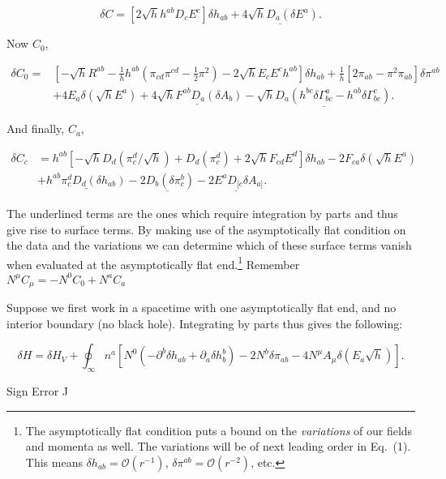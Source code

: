 \documentclass[titlepage]{article}
\def\beq{\begin{equation}}
\def\eeq{\end{equation}}
\begin{document}
\beq
\delta C = \left[2 \sqrt{h} h^{ab}D_cE^c \right] \delta h_{ab} + \underline{4\sqrt{h} D_a\left(\delta E^a\right)}.
\eeq

\noindent
Now $C_0$,

\beq
\begin{aligned}
\delta C_0 =& \left[-\sqrt{h}R^{ab}-\frac{1}{h}h^{ab}\left( \pi_{cd}\pi^{cd} -\frac{1}{2} \pi^2 \right) -2\sqrt{h}E_cE^c h^{ab} \right] \delta h_{ab} + \frac{1}{h}\left[2\pi_{ab} - \pi^2 \pi_{ab} \right] \delta \pi^{ab} \\ &+ 4 E_a \delta\left( \sqrt{h} E^a \right) + \underline{4\sqrt{h}F^{ab}D_a(\delta A_b)} - \underline{\sqrt{h}D_a \left(h^{bc} \delta \Gamma^a_{bc} - h^{ab}\delta \Gamma^c_{bc} \right)}.
\end{aligned}
\eeq

\noindent
And finally, $C_a$,

\beq
\begin{aligned}
\delta C_c &= h^{ab}\left[ - \sqrt{h}D_d\left(\pi_c^d /\sqrt{h}\right) + D_d\left(\pi_c^d\right) + 2 \sqrt{h}F_{cd}E^d  \right]\delta h_{ab} - 2 F_{ca}\delta\left(\sqrt{h} E^a \right) \\ &+ \underline{ h^{ab}  \pi_c^d D_d \left( \delta h_{ab} \right)  } -\underline{2D_b\left(\delta \pi_c^b\right)} - \underline{2E^aD_{[c} \delta A_{a]}}   .
\end{aligned}
\eeq


The underlined terms are the ones which require integration by parts and thus give rise to surface terms.  By making use of the asymptotically flat condition on the data and the variations we can determine which of these surface terms vanish when evaluated at the asymptotically flat end.\footnote{The asymptotically flat condition puts a bound on the \emph{variations} of our fields and momenta as well.  The variations will be of next leading order in Eq.\ (1).  This means $\delta h_{ab} = \mathcal{O}\left(r^{-1}\right)$, $\delta\pi^{ab} = \mathcal{O}\left(r^{-2}\right)  $, etc.}  Remember $N^\mu C_\mu = -N^0 C_0 + N^a C_a$

Suppose we first work in a spacetime with one asymptotically flat end, and no interior boundary (no black hole).  Integrating by parts thus gives the following:

\beq
\delta H = \delta H_V + \oint_{\infty}n^a\left[N^0\left( - \partial^b\delta h_{ab} + \partial_a\delta h^b_b \right) - 2 N^b \delta \pi_{ab} - 4 N^\mu A_\mu \delta\left(E_a \sqrt{h}  \right) \right] .
\eeq

Sign Error ^^
\end{document}
